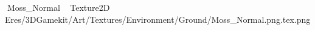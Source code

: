    Moss_Normal             	   Texture2D
   E   res/3DGamekit/Art/Textures/Environment/Ground/Moss_Normal.png.tex.png
